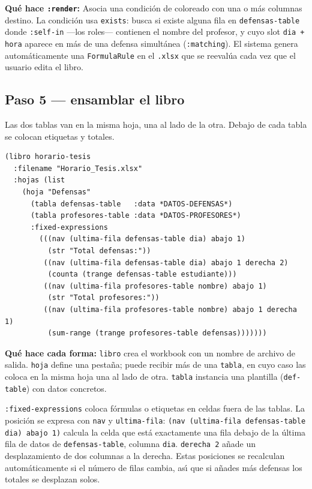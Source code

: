 \documentclass[12pt,a4paper]{report}
\begin{document}
\textbf{Qu\'e hace \texttt{:render}:}
Asocia una condici\'on de coloreado con una o m\'as columnas destino.
La condici\'on usa \texttt{exists}: busca si existe alguna fila en
\texttt{defensas-table} donde \texttt{:self-in} ---los roles--- contienen
el nombre del profesor, y cuyo slot \texttt{dia + hora} aparece en m\'as
de una defensa simult\'anea (\texttt{:matching}).
El sistema genera autom\'aticamente una \texttt{FormulaRule} en el
\texttt{.xlsx} que se reevalúa cada vez que el usuario edita el libro.

\subsection{Paso 5 --- ensamblar el libro}

Las dos tablas van en la misma hoja, una al lado de la otra.
Debajo de cada tabla se colocan etiquetas y totales.

\begin{lstlisting}[caption={tutorial-horario.lisp --- workbook.},
                   firstnumber=25]
(libro horario-tesis
  :filename "Horario_Tesis.xlsx"
  :hojas (list
    (hoja "Defensas"
      (tabla defensas-table   :data *DATOS-DEFENSAS*)
      (tabla profesores-table :data *DATOS-PROFESORES*)
      :fixed-expressions
        (((nav (ultima-fila defensas-table dia) abajo 1)
          (str "Total defensas:"))
         ((nav (ultima-fila defensas-table dia) abajo 1 derecha 2)
          (counta (trange defensas-table estudiante)))
         ((nav (ultima-fila profesores-table nombre) abajo 1)
          (str "Total profesores:"))
         ((nav (ultima-fila profesores-table nombre) abajo 1 derecha 1)
          (sum-range (trange profesores-table defensas)))))))
\end{lstlisting}

\textbf{Qu\'e hace cada forma:}
\texttt{libro} crea el workbook con un nombre de archivo de salida.
\texttt{hoja} define una pesta\~na; puede recibir m\'as de una
\texttt{tabla}, en cuyo caso las coloca en la misma hoja una al lado de otra.
\texttt{tabla} instancia una plantilla (\texttt{def-table}) con datos
concretos.

\texttt{:fixed-expressions} coloca f\'ormulas o etiquetas en celdas fuera
de las tablas.
La posici\'on se expresa con \texttt{nav} y \texttt{ultima-fila}:
\texttt{(nav (ultima-fila defensas-table dia) abajo 1)} calcula la celda
que est\'a exactamente una fila debajo de la \'ultima fila de datos de
\texttt{defensas-table}, columna \texttt{dia}.
\texttt{derecha 2} a\~nade un desplazamiento de dos columnas a la derecha.
Estas posiciones se recalculan autom\'aticamente si el n\'umero de filas
cambia, as\'{\i} que si a\~nades m\'as defensas los totales se desplazan solos.
\end{document}
